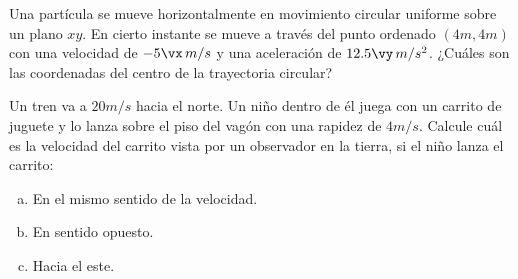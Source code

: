 \begin{mdframed}[style=warning]
	\begin{ejercicio}
		Una partícula se mueve horizontalmente en movimiento circular uniforme sobre un plano $xy$. En cierto instante se mueve a través del punto ordenado $(4m,4m)$ con una velocidad de $-5\vx \, m/s$ y una aceleración de $12.5\vy \, m/s^2$. ¿Cuáles son las coordenadas del centro de la trayectoria circular?
	\end{ejercicio}
\end{mdframed}










\begin{mdframed}[style=warning]
	\begin{ejercicio}
		Un tren va a $20m/s$ hacia el norte. Un niño dentro de él juega con un carrito de juguete y lo lanza sobre el piso del vagón con una rapidez de $4m/s$. Calcule cuál es la velocidad del carrito vista por un observador en la tierra, si el niño lanza el carrito:
		\begin{enumerate}[a)]
			\item En el mismo sentido de la velocidad.
			\item En sentido opuesto.
			\item Hacia el este.
		\end{enumerate}
	\end{ejercicio}
\end{mdframed}






























